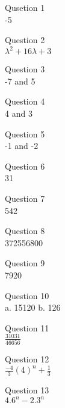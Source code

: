 \documentclass{article}
\begin{document}
Qusetion 1\\
-5

Question 2\\
\(\lambda^2 +16\lambda +3\)

Question 3\\
-7 and 5

Question 4\\
4 and 3

Question 5\\
-1 and -2

Question 6\\
31

Question 7\\
542

Question 8\\
372556800

Question 9\\
7920

Question 10\\
a. 15120
b. 126

Question 11\\
\(\frac{31031}{46656}\)

Question 12\\
\(\frac{-4}{3}(4)^n + \frac{1}{3}\)

Question 13\\
\(4.6^n - 2.3^n\)
\end{document}
